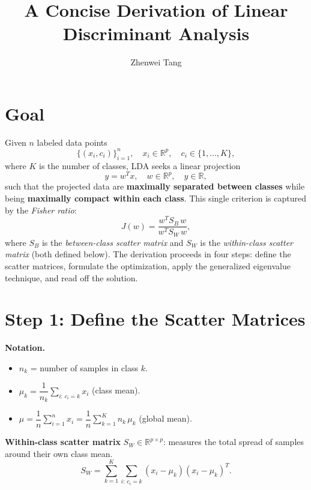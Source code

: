 \documentclass[11pt]{article}
\begin{document}
\title{A Concise Derivation of Linear Discriminant Analysis}
\author{Zhenwei Tang}
\date{}
\maketitle

\section*{Goal}

Given $n$ labeled data points
\[
  \{(x_i, c_i)\}_{i=1}^{n}, \quad x_i \in \mathbb{R}^p, \quad c_i \in \{1, \dots, K\},
\]
where $K$ is the number of classes, LDA seeks a linear projection
\[
  y = w^T x, \quad w \in \mathbb{R}^p, \quad y \in \mathbb{R},
\]
such that the projected data are \textbf{maximally separated between classes} while being \textbf{maximally compact within each class}.
This single criterion is captured by the \emph{Fisher ratio}:
\[
  J(w) = \frac{w^T S_B\, w}{w^T S_W\, w},
\]
where $S_B$ is the \emph{between-class scatter matrix} and $S_W$ is the \emph{within-class scatter matrix} (both defined below).
The derivation proceeds in four steps: define the scatter matrices, formulate the optimization, apply the generalized eigenvalue technique, and read off the solution.

\section*{Step 1: Define the Scatter Matrices}

\textbf{Notation.}
\begin{itemize}
  \item $n_k$ = number of samples in class $k$.
  \item $\mu_k = \dfrac{1}{n_k}\displaystyle\sum_{i:\,c_i=k} x_i$ \quad (class mean).
  \item $\mu = \dfrac{1}{n}\displaystyle\sum_{i=1}^n x_i = \dfrac{1}{n}\sum_{k=1}^K n_k\,\mu_k$ \quad (global mean).
\end{itemize}

\textbf{Within-class scatter matrix} $S_W \in \mathbb{R}^{p\times p}$: measures the total spread of samples around their own class mean.
\[
  S_W = \sum_{k=1}^{K} \sum_{i:\,c_i=k} (x_i - \mu_k)(x_i - \mu_k)^T.
\]
\end{document}
